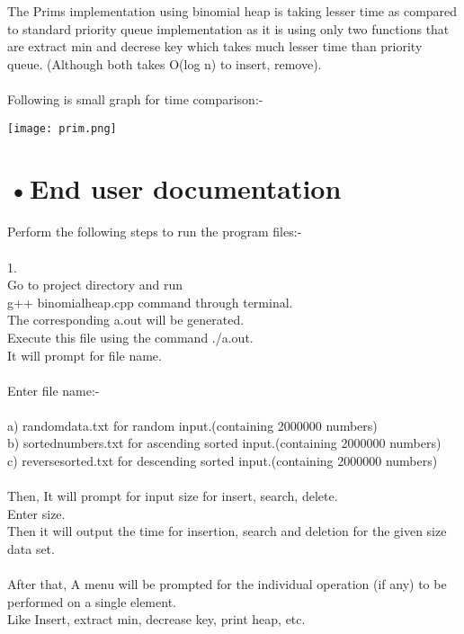 \documentclass[10pt,a4paper]{article} ,
\begin{document}
The Prims implementation using binomial heap is taking lesser time as compared to standard priority queue implementation as it is using only two functions that are extract min and decrese key which takes much lesser time than priority queue. (Although both takes O(log n) to insert, remove). \\ \\

Following is small graph for time comparison:-


\texttt{[image: prim.png]} 

   \section*{•End user documentation} 


	Perform the following steps to run the program files:- \\ \\
1. \\Go to project directory and run \\
g++ binomialheap.cpp command through terminal.\\
The corresponding a.out will be generated. \\
Execute this file using the command ./a.out.\\
It will prompt for file name.\\ \\
Enter file name:- \\ \\
a) randomdata.txt for random input.(containing 2000000 numbers)\\
b) sortednumbers.txt for ascending sorted input.(containing 2000000 numbers)\\
c) reversesorted.txt for descending sorted input.(containing 2000000 numbers)\\ \\

Then, It will prompt for input size for insert, search, delete.\\
Enter size.\\

Then it will output the time for insertion, search and deletion for the given size data set.\\ \\
After that,
A menu will be prompted for the individual operation (if any) to be performed on a single element.\\
Like Insert, extract min, decrease key, print heap, etc.\\ \\ \\
	
\end{document}
